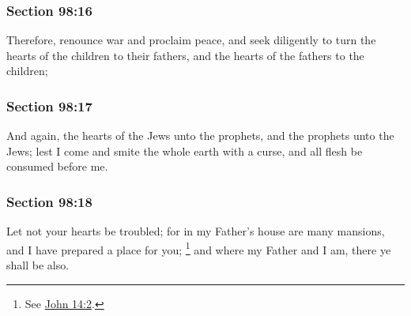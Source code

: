 	\subsubsection{Section 98:16} %
		\label{DC98-16}

		Therefore, renounce war and proclaim peace, and seek diligently to turn the hearts of the children to their fathers, and the hearts of the fathers to the children;


	\subsubsection{Section 98:17} %
		\label{DC98-17}

		And again, the hearts of the Jews unto the prophets, and the prophets unto the Jews; lest I come and smite the whole earth with a curse, and all flesh be consumed before me.


	\subsubsection{Section 98:18} %
		\label{DC98-18}

		Let not your hearts be troubled; for in my Father's house are many mansions, and I have prepared a place for you;%
			\footnote{%
				See \hyperref[JOHN-14-2]{John 14:2}.
				}
		and where my Father and I am, there ye shall be also.


